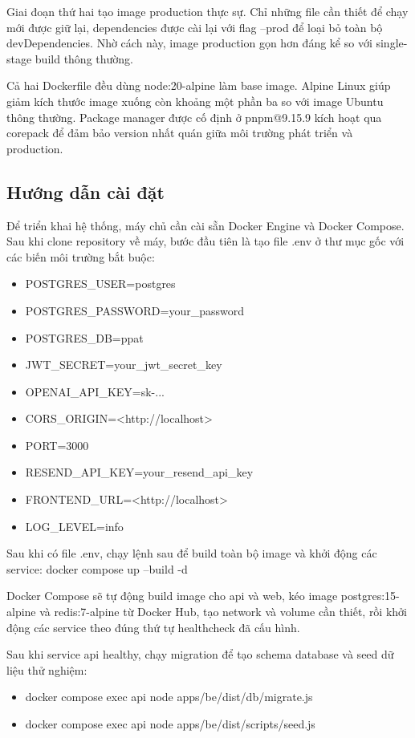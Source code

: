 \documentclass[../main.tex]{subfiles}
\begin{document}
Giai đoạn thứ hai tạo image production thực sự. Chỉ những file cần thiết để chạy mới được giữ lại, dependencies được cài lại với flag --prod để loại bỏ toàn bộ devDependencies. Nhờ cách này, image production gọn hơn đáng kể so với single-stage build thông thường.

Cả hai Dockerfile đều dùng node:20-alpine làm base image. Alpine Linux giúp giảm kích thước image xuống còn khoảng một phần ba so với image Ubuntu thông thường. Package manager được cố định ở pnpm@9.15.9 kích hoạt qua corepack để đảm bảo version nhất quán giữa môi trường phát triển và production.

\subsection{Hướng dẫn cài đặt}

Để triển khai hệ thống, máy chủ cần cài sẵn Docker Engine và Docker Compose. Sau khi clone repository về máy, bước đầu tiên là tạo file .env ở thư mục gốc với các biến môi trường bắt buộc:

\begin{itemize}
    \item POSTGRES\_USER=postgres
    \item POSTGRES\_PASSWORD=your\_password
    \item POSTGRES\_DB=ppat
    \item JWT\_SECRET=your\_jwt\_secret\_key
    \item OPENAI\_API\_KEY=sk-...
    \item CORS\_ORIGIN=<http://localhost>
    \item PORT=3000
    \item RESEND\_API\_KEY=your\_resend\_api\_key
    \item FRONTEND\_URL=<http://localhost>
    \item LOG\_LEVEL=info
\end{itemize}

Sau khi có file .env, chạy lệnh sau để build toàn bộ image và khởi động các service: docker compose up --build -d

Docker Compose sẽ tự động build image cho api và web, kéo image postgres:15-alpine và redis:7-alpine từ Docker Hub, tạo network và volume cần thiết, rồi khởi động các service theo đúng thứ tự healthcheck đã cấu hình.

Sau khi service api healthy, chạy migration để tạo schema database và seed dữ liệu thử nghiệm:

\begin{itemize}
    \item docker compose exec api node apps/be/dist/db/migrate.js
    \item docker compose exec api node apps/be/dist/scripts/seed.js
\end{itemize}
\end{document}
